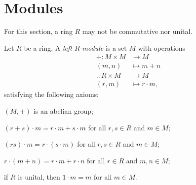 \documentclass[10pt]{mypackage}
\begin{document}
\section{Modules}%
For this section, a ring $R$ may not be commutative nor unital.
\begin{definition}
  Let $R$ be a ring. A \textit{left $R$-module} is a set $M$ with operations
  \begin{align*}
    +\colon M\times M&\rightarrow M\\
    \left( m,n \right) &\mapsto m+n\\
    .\colon R\times M&\rightarrow M\\
    \left( r,m \right) &\mapsto r\cdot m,
  \end{align*}
  satisfying the following axioms:
  \begin{description}[font=\normalfont]
    \item[(M0)] $\left( M,+ \right)$ is an abelian group;
    \item[(M1)] $\left( r+s \right)\cdot m = r\cdot m + s\cdot m$ for all $r,s\in R$ and $m\in M$;
    \item[(M2)] $\left( rs \right)\cdot m = r\cdot \left( s\cdot m \right)$ for all $r,s\in R$ and $m\in M$;
    \item[(M3)] $r\cdot \left( m+n \right) = r\cdot m + r\cdot n$ for all $r\in R$ and $m,n\in M$;
    \item[(M4)] if $R$ is unital, then $1\cdot m = m$ for all $m\in M$.
  \end{description}
\end{definition}
\end{document}
